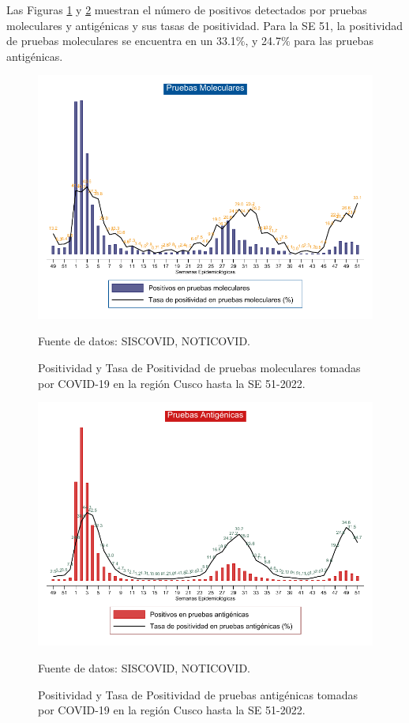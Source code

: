 \documentclass[12pt,a4paper,openany]{book}
\begin{document}
	
	
	Las Figuras \ref{fig:positividad_pcr} y \ref{fig:positividad_ag} muestran el número de positivos detectados por pruebas moleculares y antigénicas y sus tasas de positividad. Para la SE 51, la positividad de pruebas moleculares se encuentra en un 33.1$\%$, y 24.7$\%$ para las pruebas antigénicas.
	
	
	\begin{landscape}
		\begin{figure}[h]
			\caption{Positividad y Tasa de Positividad de pruebas moleculares tomadas por COVID-19 en la región Cusco hasta la SE 51-2022.}\label{fig:positividad_pcr}
			\begin{center}
				\includegraphics[width=0.90\linewidth]{../figuras/positividad_pcr.pdf}
			\end{center}
			{\footnotesize {Fuente de datos: SISCOVID, NOTICOVID.}}
		\end{figure}
	\end{landscape}
	\clearpage
	\begin{landscape}
		
		\begin{figure}[h]
			\caption{ Positividad y Tasa de Positividad de pruebas antigénicas tomadas por COVID-19 en la región Cusco hasta la SE 51-2022.}\label{fig:positividad_ag}
			\begin{center}
				\includegraphics[width=0.90\linewidth]{../figuras/positividad_ag.pdf}
			\end{center}
			{\footnotesize {Fuente de datos: SISCOVID, NOTICOVID.}}
		\end{figure}
	\end{landscape}
\end{document}
